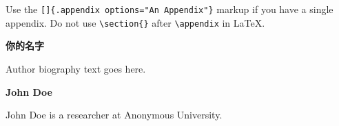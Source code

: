 \documentclass[
  11pt,
  onesidefontset=none,
]{ctexbook}
\theoremstyle{plain}
\theoremstyle{plain}
\theoremstyle{definition}
\theoremstyle{plain}
\theoremstyle{remark}
\begin{document}
{}

Use the \texttt{{[}{]}\{.appendix\ options="An\ Appendix"\}} markup if
you have a single appendix. Do not use
\texttt{\textbackslash{}section\{\}} after
\texttt{\textbackslash{}appendix} in LaTeX.

\let\stdchaptermark\chaptermark
\renewcommand{\chaptermark}[1]{}
\makeatletter
\let\stdmkboth\@mkboth
\def\@mkboth#1#2{}
\makeatother
\markright{}
\backmatter
\renewcommand\bibname{参考文献}



\vspace*{18pt}
\noindent\textbf{你的名字}\par

Author biography text goes here.\par
\vspace*{18pt}
\noindent\textbf{John Doe}\par

John Doe is a researcher at Anonymous University.\par
\end{document}
